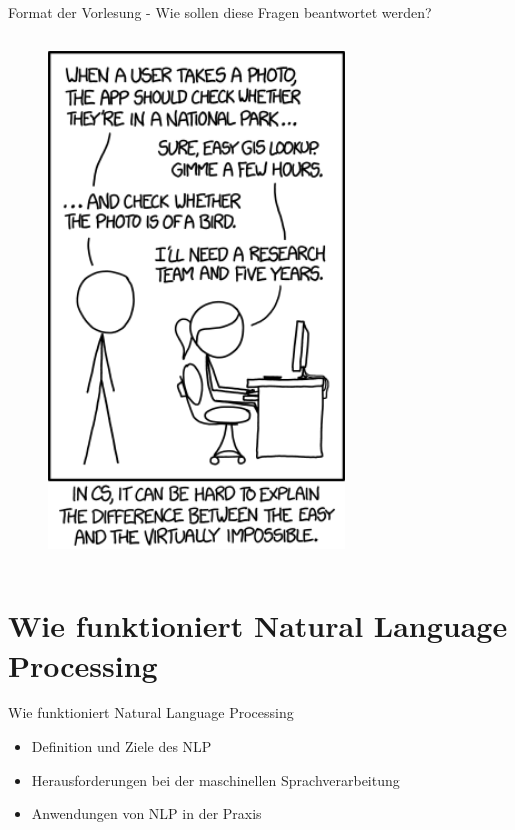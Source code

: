 \documentclass[aspectratio=1610, xcolor=dvipsnames, 9pt]{beamer}
\begin{document}
\begin{frame}{Format der Vorlesung - Wie sollen diese Fragen beantwortet werden?}
\begin{columns}
\begin{column}{0.3\textwidth}
\begin{figure}
             \includegraphics[width=0.7\textwidth]{images/tasks.png} 
 \end{figure}
    \end{column}
  \end{columns}
\end{frame}

\section{Wie funktioniert Natural Language Processing}

\begin{frame}{Wie funktioniert Natural Language Processing}
  \begin{itemize}
    \item Definition und Ziele des NLP \\
    \item Herausforderungen bei der maschinellen Sprachverarbeitung \\
    \item Anwendungen von NLP in der Praxis
  \end{itemize}
\end{frame}
\end{document}
